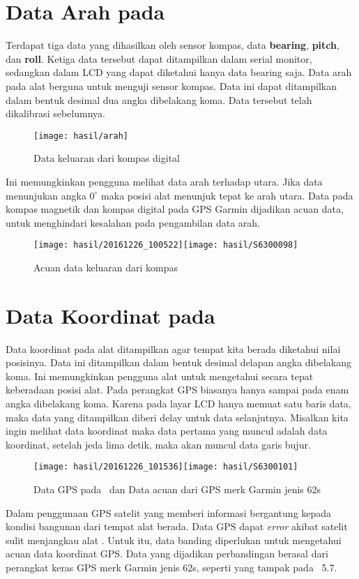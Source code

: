 \section{Data Arah pada \Alat}
Terdapat tiga data yang dihasilkan oleh sensor kompas, data \textbf{bearing}, \textbf{pitch}, dan \textbf{roll}. Ketiga data tersebut dapat ditampilkan dalam serial monitor, sedangkan dalam LCD yang dapat diketahui hanya data bearing saja. Data arah pada alat berguna untuk menguji sensor kompas. Data ini dapat ditampilkan dalam bentuk desimal dua angka dibelakang koma.  Data tersebut telah dikalibrasi sebelumnya. 
\begin{figure}
\centering
\texttt{[image: hasil/arah]}
\caption{Data keluaran dari kompas digital}
\end{figure}
Ini memungkinkan pengguna melihat data arah terhadap utara. Jika data menunjukan angka $0^\circ$ maka posisi alat menunjuk tepat ke arah utara. Data pada kompas magnetik dan kompas digital pada GPS Garmin 
dijadikan acuan data, untuk menghindari kesalahan pada pengambilan data arah.
\begin{figure}
\centering
\texttt{[image: hasil/20161226\_100522]}\texttt{[image: hasil/S6300098]}
\caption{Acuan data keluaran dari kompas}
\end{figure}
\section{Data Koordinat pada \Alat}\label{sec:pos}
Data koordinat pada alat ditampilkan agar tempat kita berada diketahui nilai posisinya. Data ini ditampilkan dalam bentuk desimal delapan angka dibelakang koma. Ini memungkinkan pengguna alat untuk mengetahui secara tepat keberadaan posisi alat. Pada perangkat GPS biasanya hanya sampai pada enam angka dibelakang koma. Karena pada layar LCD hanya memuat satu baris data, maka data yang ditampilkan diberi delay untuk data selanjutnya. Misalkan kita ingin melihat data koordinat maka data pertama yang muncul adalah data koordinat, setelah jeda lima detik, maka akan muncul data garis bujur.\citep{Khazin2009}
\begin{figure}
\centering
\texttt{[image: hasil/20161226\_101536]}\texttt{[image: hasil/S6300101]}
\caption{Data GPS pada \alat\ dan Data acuan dari GPS merk Garmin jenis 62s}
\end{figure}
Dalam penggunaan GPS satelit yang memberi informasi bergantung kepada kondisi bangunan dari tempat alat berada. Data GPS dapat \textit{error} akibat satelit sulit menjangkau alat \alat. Untuk itu, data banding diperlukan untuk mengetahui acuan data koordinat GPS. Data yang dijadikan perbandingan berasal dari perangkat keras GPS merk Garmin jenis 62s, seperti yang tampak pada \gambar\ 5.7. 

